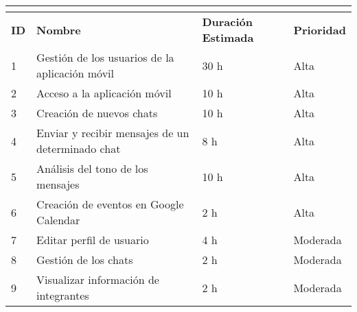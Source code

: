 \begin{tabular}{|l|l|l|l|}
	\hline
	\multicolumn{4}{|c|}{\cellcolor[HTML]{343434}{\color[HTML]{FFFFFF} \textbf{Pila de Producto}}} \\ \hline
	\textbf{ID}              & \textbf{Nombre}              & \textbf{Duración Estimada}             & \textbf{Prioridad}             \\ \hline
	1               &  Gestión de los usuarios de la aplicación móvil                   & 30 h                              & Alta                      \\ \hline
	2               & Acceso a la aplicación móvil                    & 10 h                               & Alta                      \\ \hline
	3               & Creación de nuevos chats   & 10 h            & Alta                      \\ \hline
	4               & Enviar y recibir mensajes de un determinado chat                    & 8 h                     & Alta                      \\ \hline
	5               & Análisis del tono de los mensajes                    & 10 h                               & Alta                      \\ \hline
	6               & Creación de eventos en Google Calendar                    & 2 h                               & Alta                  \\ \hline
	7               & Editar perfil de usuario                    & 4 h                               & Moderada                      \\ \hline
	8               & Gestión de los chats                    & 2 h                               & Moderada                      \\ \hline
	9               & Visualizar información de integrantes                    & 2 h                               & Moderada                      \\ \hline
\end{tabular}
